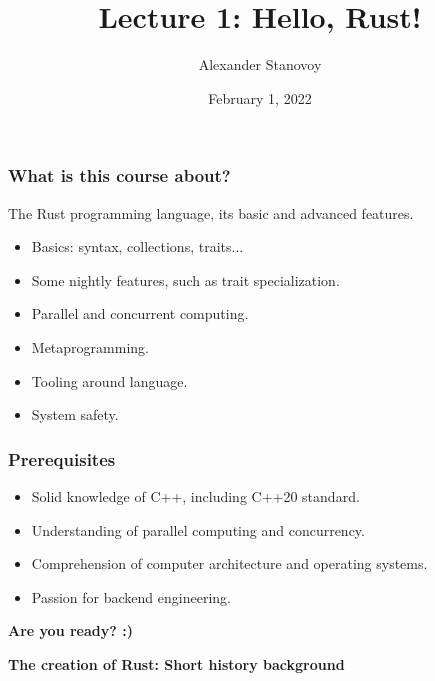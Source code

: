 \documentclass[aspectratio=1610,t]{beamer}
\title{Lecture 1: Hello, Rust!}
\date{February 1, 2022}
\author{Alexander Stanovoy}
\institute{alex.stanovoy@gmail.com}
\begin{document}

\begin{frame}
\maketitle
\end{frame}


\begin{frame}[c]
\frametitle{What is this course about?}
The Rust programming language, its basic and advanced features.
\begin{itemize}
    \item Basics: syntax, collections, traits...
    \item Some nightly features, such as trait specialization.
    \item Parallel and concurrent computing.
    \item Metaprogramming.
    \item Tooling around language.
    \item System safety.
\end{itemize}
\end{frame}


\begin{frame}[c]
\frametitle{Prerequisites}
\begin{itemize}
    \item Solid knowledge of C++, including C++20 standard.
    \item Understanding of parallel computing and concurrency.
    \item Comprehension of computer architecture and operating systems.
    \item Passion for backend engineering.
\end{itemize}
\end{frame}

\begin{frame}[c]
\centering\Huge\textbf{Are you ready? :)}
\end{frame}


\begin{frame}[c]
\centering\Huge\textbf{The creation of Rust: Short history background}
\end{frame}
\end{document}
